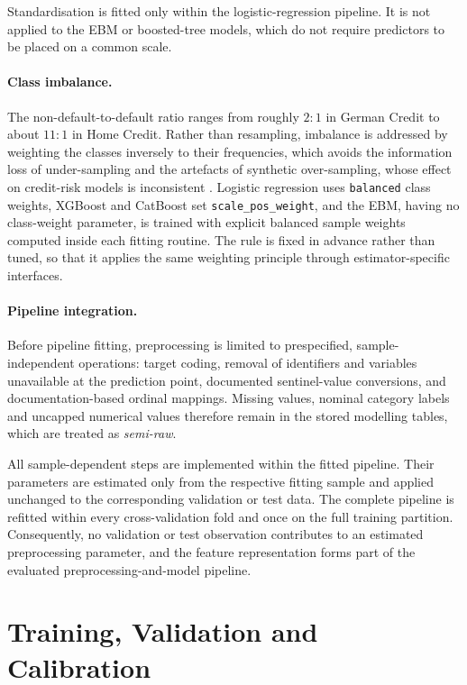 Standardisation is fitted only within the logistic-regression pipeline. It is not
applied to the EBM or boosted-tree models, which do not require predictors to be
placed on a common scale.

\paragraph{Class imbalance.}
The non-default-to-default ratio ranges from roughly $2{:}1$ in German Credit to about
$11{:}1$ in Home Credit. Rather than resampling, imbalance is addressed by weighting the
classes inversely to their frequencies, which avoids the information loss of
under-sampling and the artefacts of synthetic over-sampling, whose effect on credit-risk
models is inconsistent \citep{zhaoResamplingTechniquesStudy2024}.
Logistic regression uses \texttt{balanced} class weights, XGBoost and CatBoost set
\texttt{scale\_pos\_weight}, and the EBM, having no class-weight parameter, is trained
with explicit balanced sample weights computed inside each fitting routine. The rule is fixed in
advance rather than tuned, so that it applies the same weighting principle through
estimator-specific interfaces.

\paragraph{Pipeline integration.}
Before pipeline fitting, preprocessing is limited to prespecified,
sample-independent operations: target coding, removal of identifiers and variables
unavailable at the prediction point, documented sentinel-value conversions, and
documentation-based ordinal mappings. Missing values, nominal category labels and
uncapped numerical values therefore remain in the stored modelling tables, which
are treated as \emph{semi-raw}.

All sample-dependent steps are
implemented within the fitted pipeline. Their parameters are estimated only from
the respective fitting sample and applied unchanged to the corresponding
validation or test data. The complete pipeline is refitted within every
cross-validation fold and once on the full training partition. Consequently, no
validation or test observation contributes to an estimated preprocessing
parameter, and the feature representation forms part of the evaluated
preprocessing-and-model pipeline.



\section{Training, Validation and Calibration}\label{sec:validation}


